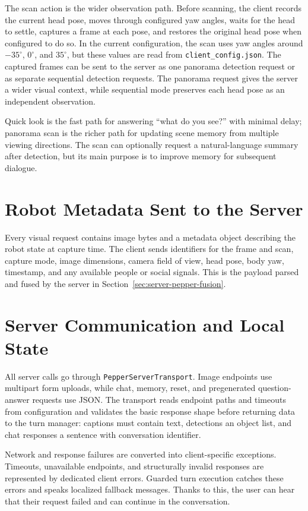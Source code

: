 The scan action is the wider observation path.
Before scanning, the client records the current head pose, moves through configured yaw angles, waits for the head to settle, captures a frame at each pose, and restores the original head pose when configured to do so.
In the current configuration, the scan uses yaw angles around \(-35^\circ\), \(0^\circ\), and \(35^\circ\), but these values are read from \texttt{client\_config.json}.
The captured frames can be sent to the server as one panorama detection request or as separate sequential detection requests.
The panorama request gives the server a wider visual context, while sequential mode preserves each head pose as an independent observation.

Quick look is the fast path for answering ``what do you see?'' with minimal delay; panorama scan is the richer path for updating scene memory from multiple viewing directions.
The scan can optionally request a natural-language summary after detection, but its main purpose is to improve memory for subsequent dialogue.

\section{Robot Metadata Sent to the Server}\label{sec:client-metadata}

Every visual request contains image bytes and a metadata object describing the robot state at capture time.
The client sends identifiers for the frame and scan, capture mode, image dimensions, camera field of view, head pose, body yaw, timestamp, and any available people or social signals.
This is the payload parsed and fused by the server in Section~\ref{sec:server-pepper-fusion}.

\section{Server Communication and Local State}\label{sec:client-transport-state}

All server calls go through \texttt{PepperServerTransport}.
Image endpoints use multipart form uploads, while chat, memory, reset, and pregenerated question-answer requests use JSON.
The transport reads endpoint paths and timeouts from configuration and validates the basic response shape before returning data to the turn manager: captions must contain text, detections an object list, and chat responses a sentence with conversation identifier.

Network and response failures are converted into client-specific exceptions.
Timeouts, unavailable endpoints, and structurally invalid responses are represented by dedicated client errors.
Guarded turn execution catches these errors and speaks localized fallback messages.
Thanks to this, the user can hear that their request failed and can continue in the conversation.

